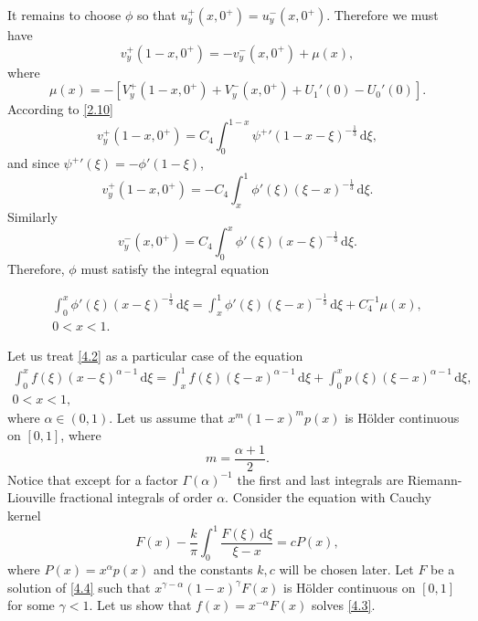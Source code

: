 \documentclass[leqno]{article}
\numberwithin{equation}{section}
\theoremstyle{plain}
\newcommand{\dd}{\,\mathrm{d}}
\begin{document}
It remains to choose $\phi$ so that $u_y^+(x,0^+) = u_y^-(x,0^+)$. 
Therefore we must have
\begin{equation*}
	v_y^+(1-x,0^+) = - v_y^-(x,0^+) + \mu(x),
\end{equation*}
where
\begin{equation*}
	\mu(x) = -[V_y^+(1-x,0^+) + V_y^-(x,0^+) + U_1'(0) - U_0'(0)].
\end{equation*}
According to \eqref{2.10}
\begin{equation*}
	v^+_y(1-x,0^+) = C_4 \int_0^{1-x} {\psi^+}'(1-x-\xi)^{-\frac 1 3} \dd \xi,
\end{equation*}
and since ${\psi^+}'(\xi) = - \phi'(1-\xi)$,
\begin{equation*}
	v_y^+(1-x,0^+) = - C_4 \int_x^{1} \phi'(\xi)(\xi-x)^{-\frac 1 3} \dd \xi.
\end{equation*}
Similarly
\begin{equation*}
	v_y^-(x,0^+) = C_4 \int_0^{x} \phi'(\xi)(x-\xi)^{-\frac 1 3} \dd \xi.
\end{equation*}
Therefore, $\phi$ must satisfy the integral equation
\addtocounter{equation}{1}
\begin{equation} 
	\label{4.2}
	\begin{split}
		\int_0^{x} \phi'(\xi)(x-\xi)^{-\frac 1 3} \dd \xi
		= \int_x^{1} \phi'(\xi)(\xi-x)^{-\frac 1 3} \dd \xi + C_4^{-1} \mu(x), \\
		0 < x < 1.
	\end{split}
\end{equation}

Let us treat \eqref{4.2} as a particular case of the equation
\begin{equation}
	\label{4.3}
	\begin{split}
		\int_0^x f(\xi) (x-\xi)^{\alpha-1} \dd \xi = \int_x^1 f(\xi) (\xi-x)^{\alpha-1} \dd \xi + \int_0^x p(\xi) (\xi-x)^{\alpha-1} \dd \xi, \\
		0 < x < 1,
	\end{split}
\end{equation}
where $\alpha \in (0,1)$.
Let us assume that $x^m (1-x)^m p(x)$ is Hölder continuous on $[0,1]$, where
\begin{equation*}
	m = \frac{\alpha+1}{2}.
\end{equation*}
Notice that except for a factor $\Gamma(\alpha)^{-1}$ the first and last integrals are Riemann-Liouville fractional integrals of order $\alpha$.
Consider the equation with Cauchy kernel
\begin{equation}
	\label{4.4}
	F(x) - \frac{k}{\pi}\int_0^1 \frac{F(\xi)\dd\xi}{\xi-x} = cP(x),
\end{equation}
where $P(x) = x^\alpha p(x)$ and the constants $k,c$ will be chosen later.
Let $F$ be a solution of \eqref{4.4} such that $x^{\gamma-\alpha}(1-x)^\gamma F(x)$ is Hölder continuous on $[0,1]$ for some $\gamma < 1$.
Let us show that $f(x) = x^{-\alpha}F(x)$ solves \eqref{4.3}.
\end{document}
